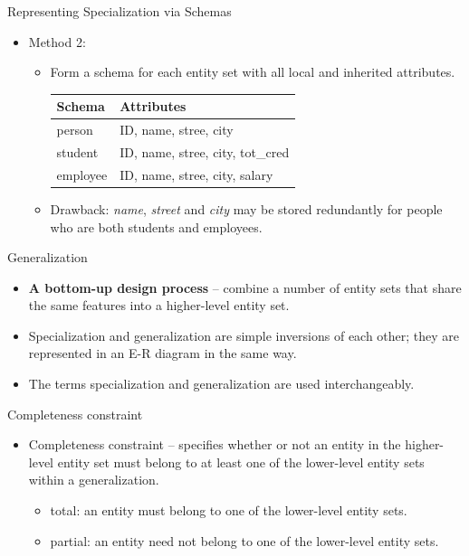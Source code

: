 \documentclass[aspectratio=169]{beamer}
\begin{document}
\begin{frame}{Representing Specialization via Schemas}
    \begin{itemize}
        \item Method 2:
        \begin{itemize}
            \item Form a schema for each entity set with all local and inherited attributes.\\
            \vspace{3mm}
            \begin{tabular}{l | l}
                Schema & Attributes \\ \hline
                person      & ID, name, stree, city \\
                student     & ID, name, stree, city, tot\_cred \\
                employee    & ID, name, stree, city, salary \\
            \end{tabular}
            \bigskip
            \item Drawback: \textit{name}, \textit{street} and \textit{city} may be stored redundantly for people who are both students and employees.
        \end{itemize}
    \end{itemize}
\end{frame}

\begin{frame}{Generalization}
    \begin{itemize}
        \item \textbf{A bottom-up design process} – combine a number of entity sets that share the same features into a higher-level entity set.
        \item Specialization and generalization are simple inversions of each other; they are represented in an E-R diagram in the same way.
        \item The terms specialization and generalization are used interchangeably.
    \end{itemize}
\end{frame}

\begin{frame}{Completeness constraint}
    \begin{itemize}
        \item Completeness constraint -- specifies whether or not an entity in the higher-level entity set must belong to at least one of the lower-level entity sets within a generalization.
        \begin{itemize}
            \item total: an entity must belong to one of the lower-level entity sets.
            \item partial: an entity need not belong to one of the lower-level entity sets.
        \end{itemize}
    \end{itemize}
\end{frame}
\end{document}
